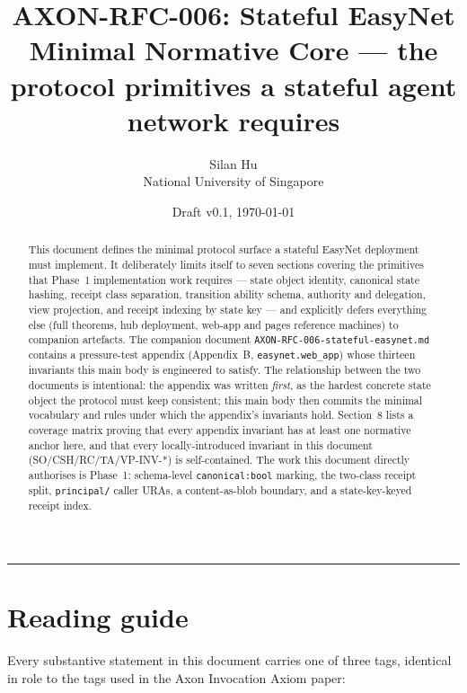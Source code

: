 \documentclass[11pt,a4paper]{article}
\title{
    \vspace{-2em}
    \textbf{\Large AXON-RFC-006: Stateful EasyNet}\\[0.3em]
    \large Minimal Normative Core --- the protocol primitives a stateful
    agent network requires
}
\author{
    Silan Hu \\ \small National University of Singapore
}
\date{Draft v0.1, \today}
\theoremstyle{definition}
\begin{document}
\maketitle

\begin{abstract}
\noindent
This document defines the minimal protocol surface a stateful EasyNet
deployment must implement. It deliberately limits itself to seven
sections covering the primitives that Phase~1 implementation work
requires --- state object identity, canonical state hashing, receipt
class separation, transition ability schema, authority and
delegation, view projection, and receipt indexing by state key ---
and explicitly defers everything else (full theorems, hub
deployment, web-app and pages reference machines) to companion
artefacts. The companion document \texttt{AXON-RFC-006-stateful-easynet.md}
contains a pressure-test appendix (Appendix~B,
\texttt{easynet.web\_app}) whose thirteen
invariants this main body is engineered to satisfy. The relationship
between the two documents is intentional: the appendix was written
\emph{first}, as the hardest concrete state object the protocol must
keep consistent; this main body then commits the minimal vocabulary
and rules under which the appendix's invariants hold. Section~8 lists
a coverage matrix proving that every appendix invariant has at least
one normative anchor here, and that every locally-introduced
invariant in this document (SO/CSH/RC/TA/VP-INV-*) is self-contained.
The work this document directly authorises is Phase~1: schema-level
\texttt{canonical:bool} marking, the two-class receipt split,
\texttt{principal/} caller URAs, a content-as-blob boundary, and a
state-key-keyed receipt index.
\end{abstract}

\tableofcontents
\vspace{1em}
\hrule
\vspace{1em}

\section{Reading guide}
\label{sec:reading-guide}

Every substantive statement in this document carries one of three
tags, identical in role to the tags used in the Axon Invocation
Axiom paper:
\end{document}
